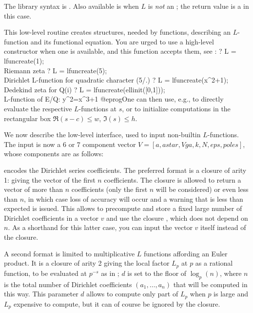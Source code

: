 The library syntax is .
Also available is
when $L$ is \emph{not} an ; the return value is a 
in this case.

\label{se:lfuncreate}
This low-level routine creates  structures, needed by
 functions, describing an $L$-function and its functional equation.
You are urged to use a high-level constructor when one is available,
and this function accepts them, see :
\bprog
? L = lfuncreate(1); \\ Riemann zeta
? L = lfuncreate(5); \\ Dirichlet L-function for quadratic character (5/.)
? L = lfuncreate(x^2+1); \\ Dedekind zeta for Q(i)
? L = lfuncreate(ellinit([0,1])); \\ L-function of E/Q: y^2=x^3+1
@eprog\noindent One can then use, e.g.,  to directly
evaluate the respective $L$-functions at $s$, or 
to initialize computations in the rectangular box $\Re(s-c) \leq w$,
$\Im(s) \leq h$.

We now describe the low-level interface, used to input non-builtin
$L$-functions. The input is now a $6$ or $7$ component vector
$V=[a,astar,Vga,k,N,eps,poles]$, whose components are as follows:

\item {} encodes the Dirichlet series coefficients. The
preferred format is a closure of arity 1:  giving
the vector of the first $n$ coefficients. The closure is allowed to return
a vector of more than $n$ coefficients (only the first $n$ will be
considered) or even less than $n$, in which case loss of accuracy will occur
and a warning that  is less than expected is issued. This
allows to precompute and store a fixed large number of Dirichlet
coefficients in a vector $v$ and use the closure , which
does not depend on $n$. As a shorthand for this latter case, you can input
the vector $v$ itself instead of the closure.

A second format is limited to multiplicative $L$ functions affording an
Euler product. It is a closure of arity 2  giving the local
factor $L_p$ at $p$ as a rational function, to be evaluated at $p^{-s}$ as in
; $d$ is set to the floor of $\log_p(n)$, where $n$ is the
total number of Dirichlet coefficients $(a_1,\dots,a_n)$ that will be
computed in this way. This parameter $d$ allows to compute only part of $L_p$
when $p$ is large and $L_p$ expensive to compute, but it can of course be
ignored by the closure.

